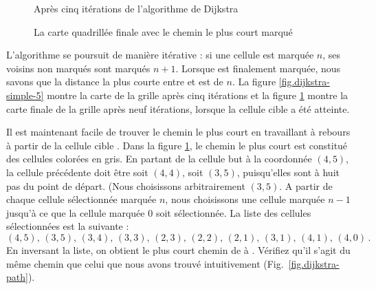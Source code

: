 \begin{figure}
\begin{minipage}{.5\textwidth}
\caption{Après cinq itérations de l'algorithme de Dijkstra}
\label{fig.dijkstra-simple-5}
\end{minipage}
\hspace{\fill}
\begin{minipage}{.5\textwidth}
\caption{La carte quadrillée finale avec le chemin le plus court marqué}
\label{fig.dijkstra-simple-9}
\end{minipage}
\end{figure}

L'algorithme se poursuit de manière itérative : si une cellule est marquée $n$, ses voisins non marqués sont marqués $n+1$. Lorsque  est finalement marquée, nous savons que la distance la plus courte entre  et  est de $n$. La figure \ref{fig.dijkstra-simple-5} montre la carte de la grille après cinq itérations et la figure \ref{fig.dijkstra-simple-9} montre la carte finale de la grille après neuf itérations, lorsque la cellule cible a été atteinte.

Il est maintenant facile de trouver le chemin le plus court en travaillant à rebours à partir de la cellule cible . Dans la figure \ref{fig.dijkstra-simple-9}, le chemin le plus court est constitué des cellules colorées en gris. En partant de la cellule but à la coordonnée $(4,5)$, la cellule précédente doit être soit $(4,4)$, soit $(3,5)$, puisqu'elles sont à huit pas du point de départ. (Nous choisissons arbitrairement $(3,5)$. A partir de chaque cellule sélectionnée marquée $n$, nous choisissons une cellule marquée $n-1$ jusqu'à ce que la cellule  marquée $0$ soit sélectionnée. La liste des cellules sélectionnées est la suivante :
\[
(4,5),\, (3,5),\, (3,4),\, (3,3),\, (2,3),\, (2,2),\, (2,1),\, (3,1),\, (4,1),\, (4,0)\,.
\]
En inversant la liste, on obtient le plus court chemin de  à . Vérifiez qu'il s'agit du même chemin que celui que nous avons trouvé intuitivement (Fig.~\ref{fig.dijkstra-path}).

